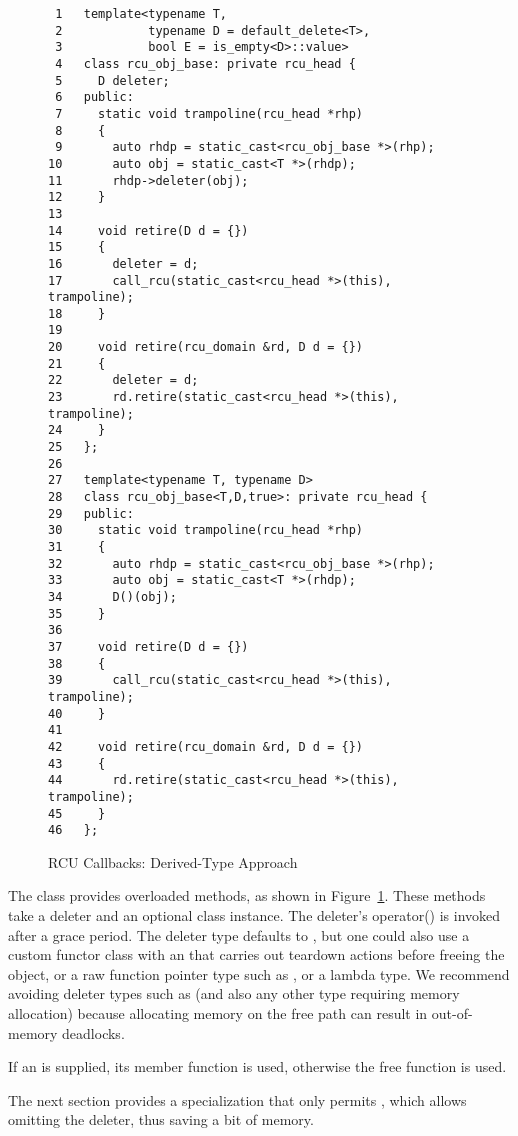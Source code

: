 \documentclass[letterpaper,10pt]{article}
\begin{document}
\begin{figure}[tbp]
{ \scriptsize
\begin{verbatim}
 1   template<typename T,
 2            typename D = default_delete<T>,
 3            bool E = is_empty<D>::value>
 4   class rcu_obj_base: private rcu_head {
 5     D deleter;
 6   public:
 7     static void trampoline(rcu_head *rhp)
 8     {
 9       auto rhdp = static_cast<rcu_obj_base *>(rhp);
10       auto obj = static_cast<T *>(rhdp);
11       rhdp->deleter(obj);
12     }
13
14     void retire(D d = {})
15     {
16       deleter = d;
17       call_rcu(static_cast<rcu_head *>(this), trampoline);
18     }
19
20     void retire(rcu_domain &rd, D d = {})
21     {
22       deleter = d;
23       rd.retire(static_cast<rcu_head *>(this), trampoline);
24     }
25   };
26
27   template<typename T, typename D>
28   class rcu_obj_base<T,D,true>: private rcu_head {
29   public:
30     static void trampoline(rcu_head *rhp)
31     {
32       auto rhdp = static_cast<rcu_obj_base *>(rhp);
33       auto obj = static_cast<T *>(rhdp);
34       D()(obj);
35     }
36
37     void retire(D d = {})
38     {
39       call_rcu(static_cast<rcu_head *>(this), trampoline);
40     }
41
42     void retire(rcu_domain &rd, D d = {})
43     {
44       rd.retire(static_cast<rcu_head *>(this), trampoline);
45     }
46   };
\end{verbatim}
}
\caption{RCU Callbacks: Derived-Type Approach}
\label{fig:RCU Callbacks: Derived-Type Approach}
\end{figure}

The  class provides overloaded  methods,
as shown in
Figure~\ref{fig:RCU Callbacks: Derived-Type Approach}.
These methods take a deleter and an optional
 class instance.
The deleter's operator() is invoked after a grace period.
The deleter type defaults to ,
but one could also use a
custom functor class with an  that carries out teardown actions
before freeing the object, or a raw function pointer type such as
, or a lambda type.
We recommend avoiding deleter types such as 
(and also any other type requiring memory allocation) because
allocating memory on the free path can result in out-of-memory deadlocks.

If an  is supplied, its 
member function is used, otherwise the  free
function is used.

The next section provides a specialization that only permits ,
which allows omitting the deleter, thus saving a bit of memory.
\end{document}
